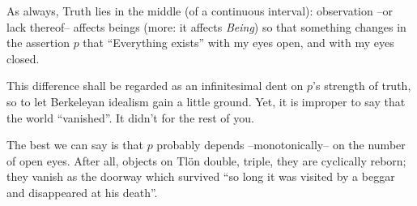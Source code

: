 	As always, Truth lies in the middle (of a continuous interval): observation --or lack thereof-- affects beings (more: it affects \emph{Being}) so that something changes in the assertion $p$ that ``Everything exists'' with my eyes open, and with my eyes closed.

	This difference shall be regarded as an infinitesimal dent on $p$'s strength of truth, so to let Berkeleyan idealism gain a little ground. Yet, it is improper to say that the world ``vanished''. It didn't for the rest of you. 
	
	The best we can say is that $p$ probably depends --monotonically-- on the number of open eyes. After all, objects on Tl\"on double, triple, they are cyclically reborn; they vanish as the doorway which survived ``so long it was visited by a beggar and disappeared at his death''.